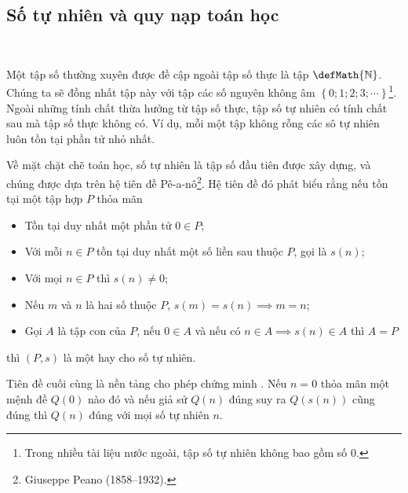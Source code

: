 \subsection{Số tự nhiên và quy nạp toán học}

\ %

Một tập số thường xuyên được đề cập ngoài tập số thực là tập  $\defMath{\mathbb{N}}$. Chúng ta sẽ đồng nhất tập này với tập các số nguyên không âm $\left\{0; 1; 2; 3; \cdots\right\}$\footnote{Trong nhiều tài liệu nước ngoài, tập số tự nhiên không bao gồm số $0$.}. Ngoài những tính chất thừa hưởng từ tập số thực, tập số tự nhiên có tính chất sau mà tập số thực không có. Ví dụ, mỗi một tập không rỗng các sô tự nhiên luôn tồn tại phần tử nhỏ nhất.

Về mặt chặt chẽ toán học, số tự nhiên là tập số đầu tiên được xây dựng, và chúng được dựa trên hệ tiên đề Pê-a-nô\footnote{Giuseppe Peano (1858–1932).}. Hệ tiên đề đó phát biểu rằng nếu tồn tại một tập hợp $P$ thỏa mãn
\begin{itemize}
   \item Tồn tại duy nhất một phần tử $0 \in P$;
   \item Với mỗi $n \in P$ tồn tại duy nhất một số liền sau thuộc $P$, gọi là $s(n)$;
   \item Với mọi $n \in P$ thì $s(n) \neq 0$;
   \item Nếu $m$ và $n$ là hai số thuộc $P$, $s(m) = s(n) \implies m = n$;
   \item Gọi $A$ là tập con của $P$, nếu $0 \in A$ và nếu có $n\in A \implies s(n) \in A$ thì $A = P$
\end{itemize}
thì $(P, s)$ là một  hay  cho số tự nhiên.

Tiên đề cuối cùng là nền tảng cho phép chứng minh . Nếu $n = 0$ thỏa mãn một mệnh đề $Q(0)$ nào đó và nếu giả sử $Q(n)$ đúng suy ra $Q(s(n))$ cũng đúng thì $Q(n)$ đúng với mọi số tự nhiên $n$.